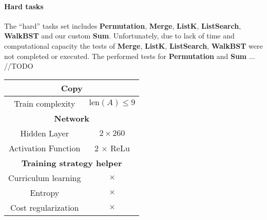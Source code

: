\paragraph{Hard tasks} 
The ``hard'' tasks set includes \textbf{Permutation}, \textbf{Merge}, \textbf{ListK}, \textbf{ListSearch}, \textbf{WalkBST} and our custom \textbf{Sum}. Unfortunately, due to lack of time and computational capacity the tests of \textbf{Merge}, \textbf{ListK}, \textbf{ListSearch}, \textbf{WalkBST} were not completed or executed. The performed tests for \textbf{Permutation} and \textbf{Sum} ... //TODO %

\begin{table}[!h]
	\centering
	\begin{tabular}{|c|c|c|c|c|c|c|}
		\hline
		\multicolumn{7}{|c|}{\textbf{Copy}} \\ \hline
		Train complexity & \multicolumn{6}{c|}{$\textrm{len}(A) \leq 9$} \\ \hline \hline \hline
		\multicolumn{7}{|c|}{\textbf{Network}} \\ \hline
		Hidden Layer & \multicolumn{6}{c|}{$2 \times 260$}\\ \hline
		Activation Function & \multicolumn{6}{c|}{2 $\times$ ReLu}\\ \hline \hline
		
		\multicolumn{7}{|c|}{\textbf{Training strategy helper}} \\ \hline
		Curriculum learning & \multicolumn{6}{c|}{$\times$} \\ \hline
		Entropy & \multicolumn{6}{c|}{$\times$}\\ \hline
		Cost regularization & \multicolumn{6}{c|}{$\times$}\\ \hline \hline		
		

\end{tabular}
\end{table}
